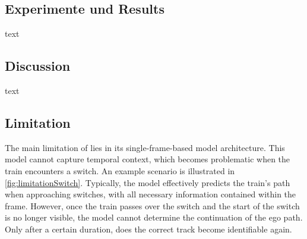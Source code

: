 \subsection{Experimente und Results}

text

\subsection{Discussion}

text

\subsection{Limitation}

The main limitation of \cite{tepNet2024} lies in its single-frame-based model architecture.
This model cannot capture temporal context, which becomes problematic when the train encounters a switch.
An example scenario is illustrated in \autoref{fig:limitationSwitch}.
Typically, the model effectively predicts the train's path when approaching switches, with all necessary information contained within the frame.
However, once the train passes over the switch and the start of the switch is no longer visible, the model cannot determine the continuation of the ego path.
Only after a certain duration, does the correct track become identifiable again.

